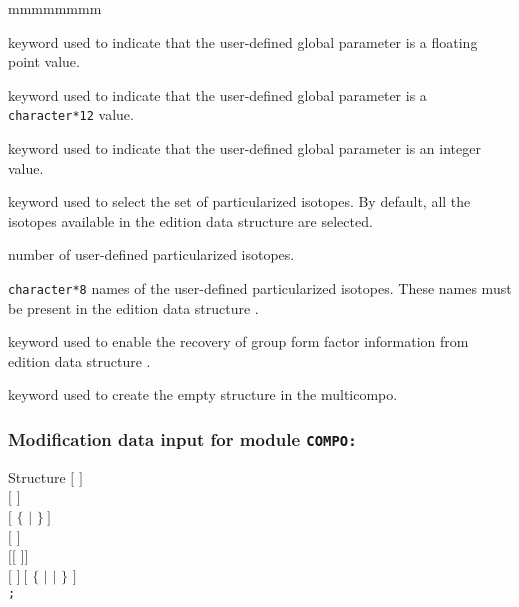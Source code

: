 \begin{ListeDeDescription}{mmmmmmmm}
\item[\moc{REAL}] keyword used to indicate that the user-defined global parameter
is a floating point value.

\item[\moc{CHAR}] keyword used to indicate that the user-defined global parameter
is a {\tt character*12} value.

\item[\moc{INTE}] keyword used to indicate that the user-defined global parameter
is an integer value.

\item[\moc{ISOT}] keyword used to select the set of particularized isotopes. By default, all the
isotopes available in the {\sc edition} data structure  are selected.

\item[\dusa{nisp}] number of user-defined particularized isotopes.

\item[\dusa{HISOP}] {\tt character*8} names of the user-defined particularized isotopes. These names must be present
in the {\sc edition} data structure .

\item[\moc{GFF}] keyword used to enable the recovery of group form factor information from {\sc edition} data structure .

\item[\moc{INIT}] keyword used to create the empty structure in the {\sc multicompo}.

\end{ListeDeDescription}

\clearpage

\subsubsection{Modification data input for module {\tt COMPO:}}\label{sect:desccpo2}

\vskip -0.5cm

\begin{DataStructure}{Structure }
$[$   $]$ \\
$[$  $]$ \\
$[$   $\{$  $|$ \moc{*} $\}~]$ \\
$[$   $]$ \\
$[[$   $]]$ \\
$[$  $]~[$   $\{$  $|$  $|$  $\}$ $]$ \\
{\tt ;}
\end{DataStructure}

